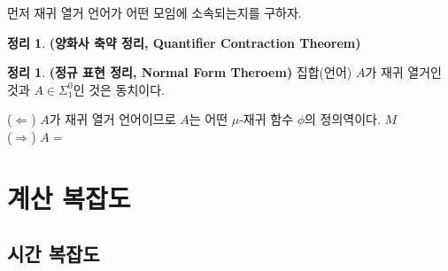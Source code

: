 \documentclass[b5paper, 10pt]{book}
\theoremstyle{definition}
\newtheorem{thm}[defn]{정리}
\newenvironment{pf*}{\pushQED{\qed}\pf}{\popQED\endpf}
\begin{document}
먼저 재귀 열거 언어가 어떤 모임에 소속되는지를 구하자. 
\begin{thm}
    \textbf{(양화사 축약 정리, Quantifier Contraction Theorem)}
    
\end{thm}
\begin{thm}
    \textbf{(정규 표현 정리, Normal Form Theroem)} 집합(언어) $A$가 재귀 열거인 것과
    $A \in \Sigma_1^0$인 것은 동치이다. 
\end{thm}
\begin{pf*}
    ($\Leftarrow$) $A$가 재귀 열거 언어이므로 $A$는 어떤 $\mu$-재귀 함수 $\phi$의
    정의역이다. $M$ \\
    ($\Rightarrow$) $A = $
\end{pf*}
\part{계산 복잡도}
\chapter{시간 복잡도}
\end{document}
